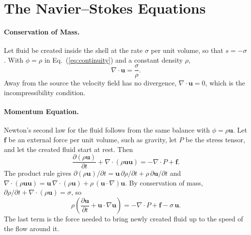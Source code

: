 \documentclass[12pt]{article}
\begin{document}
\section*{The Navier--Stokes Equations}

\paragraph{Conservation of Mass.} Let fluid be created inside the shell at the rate $\sigma$ per unit volume, so that $s = -\sigma$. With $\phi = \rho$ in Eq.~(\ref{eq:continuity}) and a constant density $\rho$,
%
\begin{equation}
\nabla\cdot\bm{u} = \frac{\sigma}{\rho}.
\label{eq:mass}
\end{equation}
%
Away from the source the velocity field has no divergence, $\nabla\cdot\bm{u} = 0$, which is the incompressibility condition.

\paragraph{Momentum Equation.} Newton's second law for the fluid follows from the same balance with $\phi = \rho\bm{u}$. Let $\bm{f}$ be an external force per unit volume, such as gravity, let $P$ be the stress tensor, and let the created fluid start at rest. Then
%
\begin{equation}
\frac{\partial (\rho \bm{u})}{\partial t} + \nabla \cdot (\rho \bm{u}\bm{u}) = -\nabla\cdot P + \bm{f}.
\end{equation}
%
The product rule gives $\partial(\rho\bm{u})/\partial t = \bm{u}\,\partial\rho/\partial t + \rho\,\partial\bm{u}/\partial t$ and $\nabla\cdot(\rho\bm{u}\bm{u}) = \bm{u}\,\nabla\cdot(\rho\bm{u}) + \rho\,(\bm{u}\cdot\nabla)\bm{u}$. By conservation of mass, $\partial\rho/\partial t + \nabla\cdot(\rho\bm{u}) = \sigma$, so
%
\begin{equation}
\rho\left(\frac{\partial \bm{u}}{\partial t} + \bm{u}\cdot\nabla\bm{u}\right) = -\nabla\cdot P + \bm{f} - \sigma\,\bm{u}.
\end{equation}
%
The last term is the force needed to bring newly created fluid up to the speed of the flow around it.
\end{document}
